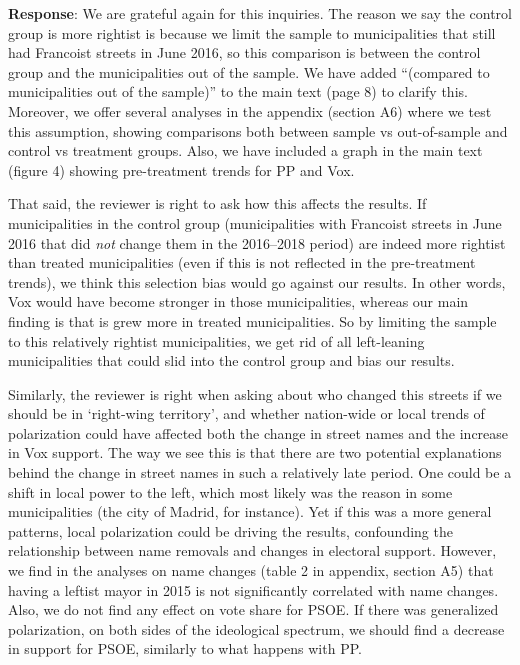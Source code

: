 \documentclass[12pt, a4paper, notitlepage]{article}
\begin{document}
\textbf{Response}: We are grateful again for this inquiries. The reason we say the control group is more rightist is because we limit the sample to municipalities that still had Francoist streets in June 2016, so this comparison is between the control group and the municipalities out of the sample. We have added ``(compared to municipalities out of the sample)'' to the main text (page 8) to clarify this.
Moreover, we offer several analyses in the appendix (section A6) where we test this assumption, showing comparisons both between sample vs out-of-sample and control vs treatment groups. Also, we have included a graph in the main text (figure 4) showing pre-treatment trends for PP and Vox.

That said, the reviewer is right to ask how this affects the results.
If municipalities in the control group (municipalities with Francoist streets in June 2016 that did \textit{not} change them in the 2016--2018 period) are indeed more rightist than treated municipalities (even if this is not reflected in the pre-treatment trends), we think this selection bias would go against our results.
In other words, Vox would have become stronger in those municipalities, whereas our main finding is that is grew more in treated municipalities.
So by limiting the sample to this relatively rightist municipalities, we get rid of all left-leaning municipalities that could slid into the control group and bias our results.

Similarly, the reviewer is right when asking about who changed this streets if we should be in `right-wing territory', and whether nation-wide or local trends of polarization could have affected both the change in street names and the increase in Vox support.
The way we see this is that there are two potential explanations behind the change in street names in such a relatively late period.
One could be a shift in local power to the left, which most likely was the reason in some municipalities (the city of Madrid, for instance).
Yet if this was a more general patterns, local polarization could be driving the results, confounding the relationship between name removals and changes in electoral support.
However, we find in the analyses on name changes (table 2 in appendix, section A5) that having a leftist mayor in 2015 is not significantly correlated with name changes.
Also, we do not find any effect on vote share for PSOE.
If there was generalized polarization, on both sides of the ideological spectrum, we should find a decrease in support for PSOE, similarly to what happens with PP.
\end{document}

